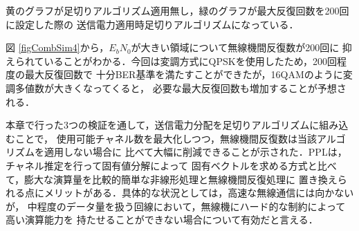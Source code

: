 黄のグラフが足切りアルゴリズム適用無し，緑のグラフが最大反復回数を200回に設定した際の
送信電力適用時足切りアルゴリズムになっている．

図 \ref{figCombSim4}から，$E_bN_0$が大きい領域について無線機間反復数が200回に
抑えられていることがわかる．今回は変調方式にQPSKを使用したため，200回程度の最大反復回数で
十分BER基準を満たすことができたが，16QAMのように変調多値数が大きくなってくると，
必要な最大反復回数も増加することが予想される．

本章で行った3つの検証を通して，送信電力分配を足切りアルゴリズムに組み込むことで，
使用可能チャネル数を最大化しつつ，無線機間反復数は当該アルゴリズムを適用しない場合に
比べて大幅に削減できることが示された．PPLは，チャネル推定を行って固有値分解によって
固有ベクトルを求める方式と比べて，膨大な演算量を比較的簡単な非線形処理と無線機間反復処理に
置き換えられる点にメリットがある．具体的な状況としては，高速な無線通信には向かないが，
中程度のデータ量を扱う回線において，無線機にハード的な制約によって高い演算能力を
持たせることができない場合について有効だと言える．